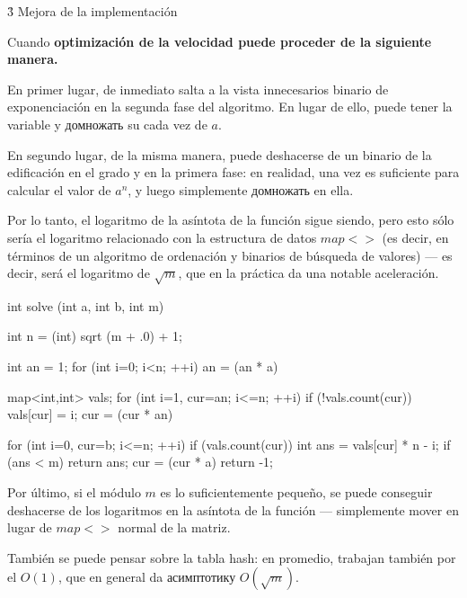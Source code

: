 \h3{ Mejora de la implementación }

Cuando \bf{optimización de la velocidad} puede proceder de la siguiente manera.

En primer lugar, de inmediato salta a la vista innecesarios binario de exponenciación en la segunda fase del algoritmo. En lugar de ello, puede tener la variable y домножать su cada vez de $a$.

En segundo lugar, de la misma manera, puede deshacerse de un binario de la edificación en el grado y en la primera fase: en realidad, una vez es suficiente para calcular el valor de $a^n$, y luego simplemente домножать en ella.

Por lo tanto, el logaritmo de la asíntota de la función sigue siendo, pero esto sólo sería el logaritmo relacionado con la estructura de datos $map<>$ (es decir, en términos de un algoritmo de ordenación y binarios de búsqueda de valores) --- es decir, será el logaritmo de $\sqrt{m}$, que en la práctica da una notable aceleración.

\code
int solve (int a, int b, int m) {
int n = (int) sqrt (m + .0) + 1;

int an = 1;
for (int i=0; i<n; ++i)
an = (an * a) %

map<int,int> vals;
for (int i=1, cur=an; i<=n; ++i) {
if (!vals.count(cur))
vals[cur] = i;
cur = (cur * an) %
}

for (int i=0, cur=b; i<=n; ++i) {
if (vals.count(cur)) {
int ans = vals[cur] * n - i;
if (ans < m)
return ans;
}
cur = (cur * a) %
}
return -1;
}
\endcode

Por último, si el módulo $m$ es lo suficientemente pequeño, se puede conseguir deshacerse de los logaritmos en la asíntota de la función --- simplemente mover en lugar de $map<>$ normal de la matriz.

También se puede pensar sobre la tabla hash: en promedio, trabajan también por el $O(1)$, que en general da асимптотику $O (\sqrt{m})$.